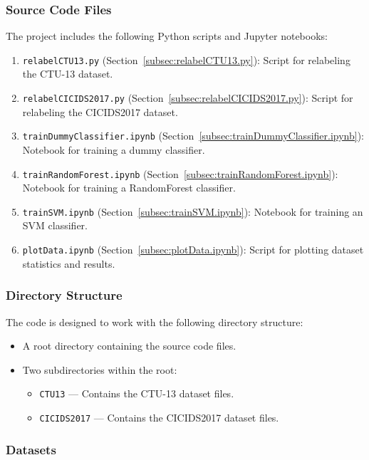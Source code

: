 \subsubsection{Source Code Files}

The project includes the following Python scripts and Jupyter notebooks:

\begin{enumerate}
    \item \texttt{relabelCTU13.py} (Section~\ref{subsec:relabelCTU13.py}): Script for relabeling the CTU-13 dataset.
    \item \texttt{relabelCICIDS2017.py} (Section~\ref{subsec:relabelCICIDS2017.py}): Script for relabeling the CICIDS2017 dataset.
    \item \texttt{trainDummyClassifier.ipynb} (Section~\ref{subsec:trainDummyClassifier.ipynb}): Notebook for training a dummy classifier.
    \item \texttt{trainRandomForest.ipynb} (Section~\ref{subsec:trainRandomForest.ipynb}): Notebook for training a RandomForest classifier.
    \item \texttt{trainSVM.ipynb} (Section~\ref{subsec:trainSVM.ipynb}): Notebook for training an SVM classifier.
    \item \texttt{plotData.ipynb} (Section~\ref{subsec:plotData.ipynb}): Script for plotting dataset statistics and results.
\end{enumerate}

\subsubsection{Directory Structure}

The code is designed to work with the following directory structure:

\begin{itemize}
    \item A root directory containing the source code files.
    \item Two subdirectories within the root:
    \begin{itemize}
        \item \texttt{CTU13} --- Contains the CTU-13 dataset files.
        \item \texttt{CICIDS2017} --- Contains the CICIDS2017 dataset files.
    \end{itemize}
\end{itemize}

\subsubsection{Datasets}

